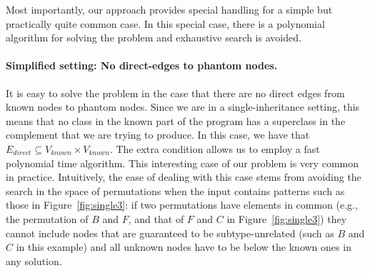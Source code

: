Most importantly, our approach provides special handling for a
simple but practically quite common case. In this special case,
there is a polynomial algorithm for solving the problem and exhaustive
search is avoided.



\paragraph{Simplified setting: No direct-edges to phantom nodes.}

It is easy to solve the problem in the case that there are no direct
edges from known nodes to phantom nodes. Since we are in a
single-inheritance setting, this means that no class in the known part
of the program has a superclass in the complement that we are trying
to produce. In this case, we have that $E_{direct} \subseteq
V_{known}\times V_{known}$. The extra condition allows us to employ a
fast polynomial time algorithm. This interesting case of our problem
is very common in practice. Intuitively, the ease of dealing with this
case stems from avoiding the search in the space of permutations when
the input contains patterns such as those in Figure~\ref{fig:single3}:
if two permutations have elements in common (e.g., the permutation of
$B$ and $F$, and that of $F$ and $C$ in Figure~\ref{fig:single3}) they
cannot include nodes that are guaranteed to be subtype-unrelated (such
as $B$ and $C$ in this example) and all unknown nodes have to be below
the known ones in any solution.

